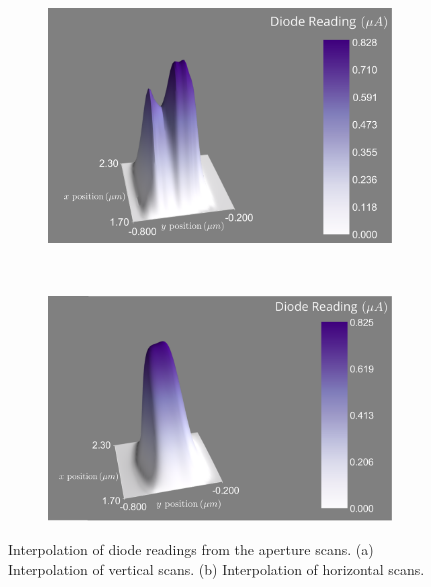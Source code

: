 \begin{figure}
    \centering
    \begin{subfigure}[b]{0.9\textwidth}
            \centering
            \includegraphics[width=\textwidth]{figures/beam/vert_scans_interp.pdf}
            \caption{}
            \label{fig:Interpolation of vertical aperture scans}
    \end{subfigure}
    \\
    \begin{subfigure}[b]{0.9\textwidth}
            \centering
            \includegraphics[width=\textwidth]{figures/beam/horiz_scans_interp.pdf}
            \caption{}
            \label{fig:Interpolation of horizontal aperture scans}
    \end{subfigure}
    \caption[Interpolation of diode readings from the aperture scans.]{Interpolation of diode readings from the aperture scans.
    (a) Interpolation of vertical scans.
    (b) Interpolation of horizontal scans.}
    \label{fig:Interpolation of aperture scans}
\end{figure}
